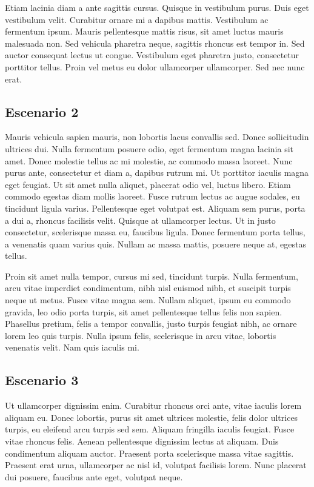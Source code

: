 \documentclass[a4paper, 10pt, twoside]{article}
\begin{document}
Etiam lacinia diam a ante sagittis cursus. Quisque in vestibulum purus. Duis eget vestibulum velit. Curabitur ornare mi a dapibus mattis. Vestibulum ac fermentum ipsum. Mauris pellentesque mattis risus, sit amet luctus mauris malesuada non. Sed vehicula pharetra neque, sagittis rhoncus est tempor in. Sed auctor consequat lectus ut congue. Vestibulum eget pharetra justo, consectetur porttitor tellus. Proin vel metus eu dolor ullamcorper ullamcorper. Sed nec nunc erat.


\subsection{Escenario 2}

Mauris vehicula sapien mauris, non lobortis lacus convallis sed. Donec sollicitudin ultrices dui. Nulla fermentum posuere odio, eget fermentum magna lacinia sit amet. Donec molestie tellus ac mi molestie, ac commodo massa laoreet. Nunc purus ante, consectetur et diam a, dapibus rutrum mi. Ut porttitor iaculis magna eget feugiat. Ut sit amet nulla aliquet, placerat odio vel, luctus libero. Etiam commodo egestas diam mollis laoreet. Fusce rutrum lectus ac augue sodales, eu tincidunt ligula varius. Pellentesque eget volutpat est. Aliquam sem purus, porta a dui a, rhoncus facilisis velit. Quisque at ullamcorper lectus. Ut in justo consectetur, scelerisque massa eu, faucibus ligula. Donec fermentum porta tellus, a venenatis quam varius quis. Nullam ac massa mattis, posuere neque at, egestas tellus.

Proin sit amet nulla tempor, cursus mi sed, tincidunt turpis. Nulla fermentum, arcu vitae imperdiet condimentum, nibh nisl euismod nibh, et suscipit turpis neque ut metus. Fusce vitae magna sem. Nullam aliquet, ipsum eu commodo gravida, leo odio porta turpis, sit amet pellentesque tellus felis non sapien. Phasellus pretium, felis a tempor convallis, justo turpis feugiat nibh, ac ornare lorem leo quis turpis. Nulla ipsum felis, scelerisque in arcu vitae, lobortis venenatis velit. Nam quis iaculis mi.


\subsection{Escenario 3}

Ut ullamcorper dignissim enim. Curabitur rhoncus orci ante, vitae iaculis lorem aliquam eu. Donec lobortis, purus sit amet ultrices molestie, felis dolor ultrices turpis, eu eleifend arcu turpis sed sem. Aliquam fringilla iaculis feugiat. Fusce vitae rhoncus felis. Aenean pellentesque dignissim lectus at aliquam. Duis condimentum aliquam auctor. Praesent porta scelerisque massa vitae sagittis. Praesent erat urna, ullamcorper ac nisl id, volutpat facilisis lorem. Nunc placerat dui posuere, faucibus ante eget, volutpat neque.
\end{document}
